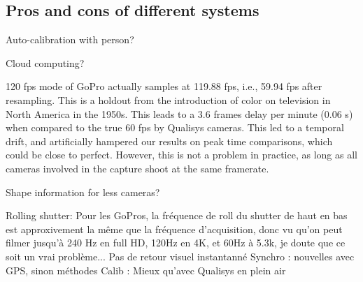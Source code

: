 





\subsection{Pros and cons of different systems}



Auto-calibration with person?

Cloud computing?

120 fps mode of GoPro actually samples at 119.88 fps, i.e., 59.94 fps after resampling. This is a holdout from the introduction of color on television in North America in the 1950s. This leads to a 3.6 frames delay per minute (0.06 s) when compared to the true 60 fps by Qualisys cameras. This led to a temporal drift, and artificially hampered our results on peak time comparisons, which could be close to perfect. However, this is not a problem in practice, as long as all cameras involved in the capture shoot at the same framerate.

Shape information for less cameras?

Rolling shutter: Pour les GoPros, la fréquence de roll du shutter de haut en bas est approxivement la même que la fréquence d'acquisition, donc vu qu'on peut filmer jusqu'à 240 Hz en full HD, 120Hz en 4K, et 60Hz à 5.3k, je doute que ce soit un vrai problème...
Pas de retour visuel instantanné
Synchro : nouvelles avec GPS, sinon méthodes
Calib : Mieux qu'avec Qualisys en plein air

